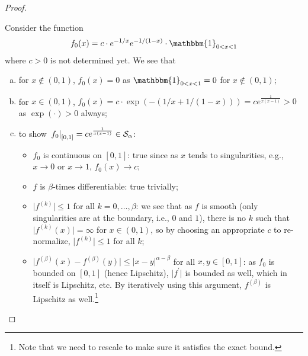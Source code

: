 \begin{proof}
\begin{claim}
\begin{enumerate}[(a)]
		\end{enumerate}
	\end{claim}
	\begin{explanation}
		Consider the function
		\[
			f_0(x) = c\cdot e^{-1 / x} e^{-1 / (1 - x)} \cdot \mathbbm{1}_{0 < x < 1}
		\]
		where \(c>0\) is not determined yet. We see that
		\begin{enumerate}[(a)]
			\item for \(x \notin (0, 1)\), \(f_0(x) = 0\) as \(\mathbbm{1}_{0 < x < 1} = 0\) for \(x \notin (0, 1)\);
			\item for \(x\in (0, 1)\), \(f_0(x)= c\cdot \exp (- (1 / x + 1 / (1 - x))) = c e^{\frac{1}{x (x - 1)}} > 0\) as \(\exp (\cdot) > 0\) always;
			\item to show \(\left.f_0\right\vert_{[0, 1]}^{} = c e^{\frac{1}{x (x - 1)}} \in \mathcal{S} _\alpha \):
			      \begin{itemize}
				      \item \(f_0\) is continuous on \([0, 1]\): true since as \(x\) tends to singularities, e.g., \(x \to 0\) or \(x \to 1\), \(f_0(x) \to c\);
				      \item \(f\) is \(\beta \)-times differentiable: true trivially;
				      \item \(\vert f^{(k)} \vert \leq 1\) for all \(k = 0, \dots , \beta \): we see that as \(f\) is smooth (only singularities are at the boundary, i.e., \(0\) and \(1\)), there is no \(k\) such that \(\vert f^{(k)} (x)\vert = \infty \) for \(x\in (0, 1)\), so by choosing an appropriate \(c\) to re-normalize, \(\vert f^{(k)} \vert \leq 1\) for all \(k\);
				      \item \(\vert f^{(\beta )} (x) - f^{(\beta )} (y)\vert \leq \vert x - y \vert ^{\alpha - \beta }\) for all \(x, y \in [0, 1]\): as \(f_0\) is bounded on \([0, 1]\) (hence Lipschitz), \(\vert f^{\prime}  \vert \) is bounded as well, which in itself is Lipschitz, etc. By iteratively using this argument, \(f^{(\beta )}\) is Lipschitz as well.\footnote{Note that we need to rescale to make sure it satisfies the exact bound.}
			      \end{itemize}
		\end{enumerate}
	\end{explanation}


\end{proof}
